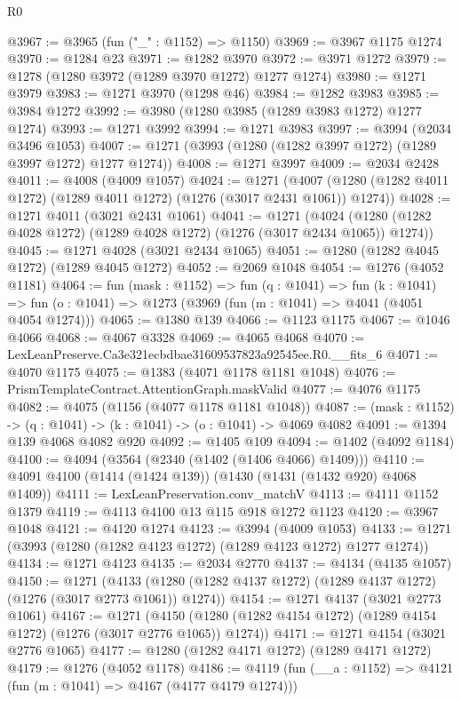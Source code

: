 \begin{lexlean}{R0}
\begin{coremodule}
@3967 := @3965 (fun ("_" : @1152) => @1150)
@3969 := @3967 @1175 @1274
@3970 := @1284 @23
@3971 := @1282 @3970
@3972 := @3971 @1272
@3979 := @1278 (@1280 @3972 (@1289 @3970 @1272) @1277 @1274)
@3980 := @1271 @3979
@3983 := @1271 @3970 (@1298 @46)
@3984 := @1282 @3983
@3985 := @3984 @1272
@3992 := @3980 (@1280 @3985 (@1289 @3983 @1272) @1277 @1274)
@3993 := @1271 @3992
@3994 := @1271 @3983
@3997 := @3994 (@2034 @3496 @1053)
@4007 := @1271 (@3993 (@1280 (@1282 @3997 @1272) (@1289 @3997 @1272) @1277 @1274))
@4008 := @1271 @3997
@4009 := @2034 @2428
@4011 := @4008 (@4009 @1057)
@4024 := @1271
    (@4007 (@1280 (@1282 @4011 @1272) (@1289 @4011 @1272) (@1276 (@3017 @2431 @1061)) @1274))
@4028 := @1271 @4011 (@3021 @2431 @1061)
@4041 := @1271
    (@4024 (@1280 (@1282 @4028 @1272) (@1289 @4028 @1272) (@1276 (@3017 @2434 @1065)) @1274))
@4045 := @1271 @4028 (@3021 @2434 @1065)
@4051 := @1280 (@1282 @4045 @1272) (@1289 @4045 @1272)
@4052 := @2069 @1048
@4054 := @1276 (@4052 @1181)
@4064 := fun (mask : @1152) =>
  fun (q : @1041) =>
  fun (k : @1041) => fun (o : @1041) => @1273 (@3969 (fun (m : @1041) => @4041 (@4051 @4054 @1274)))
@4065 := @1380 @139
@4066 := @1123 @1175
@4067 := @1046 @4066
@4068 := @4067 @3328
@4069 := @4065 @4068
@4070 := LexLeanPreserve.Ca3e321ecbdbae31609537823a92545ee.R0.__fits_6
@4071 := @4070 @1175
@4075 := @1383 (@4071 @1178 @1181 @1048)
@4076 := PrismTemplateContract.AttentionGraph.maskValid
@4077 := @4076 @1175
@4082 := @4075 (@1156 (@4077 @1178 @1181 @1048))
@4087 := (mask : @1152) -> (q : @1041) -> (k : @1041) -> (o : @1041) -> @4069 @4082
@4091 := @1394 @139 @4068 @4082 @920
@4092 := @1405 @109
@4094 := @1402 (@4092 @1184)
@4100 := @4094 (@3564 (@2340 (@1402 (@1406 @4066) @1409)))
@4110 := @4091 @4100 (@1414 (@1424 @139)) (@1430 (@1431 (@1432 @920) @4068 @1409))
@4111 := LexLeanPreservation.conv_matchV
@4113 := @4111 @1152 @1379
@4119 := @4113 @4100 @13 @115 @918 @1272 @1123
@4120 := @3967 @1048
@4121 := @4120 @1274
@4123 := @3994 (@4009 @1053)
@4133 := @1271 (@3993 (@1280 (@1282 @4123 @1272) (@1289 @4123 @1272) @1277 @1274))
@4134 := @1271 @4123
@4135 := @2034 @2770
@4137 := @4134 (@4135 @1057)
@4150 := @1271
    (@4133 (@1280 (@1282 @4137 @1272) (@1289 @4137 @1272) (@1276 (@3017 @2773 @1061)) @1274))
@4154 := @1271 @4137 (@3021 @2773 @1061)
@4167 := @1271
    (@4150 (@1280 (@1282 @4154 @1272) (@1289 @4154 @1272) (@1276 (@3017 @2776 @1065)) @1274))
@4171 := @1271 @4154 (@3021 @2776 @1065)
@4177 := @1280 (@1282 @4171 @1272) (@1289 @4171 @1272)
@4179 := @1276 (@4052 @1178)
@4186 := @4119 (fun (__a : @1152) => @4121 (fun (m : @1041) => @4167 (@4177 @4179 @1274)))

\end{coremodule}
\end{lexlean}
